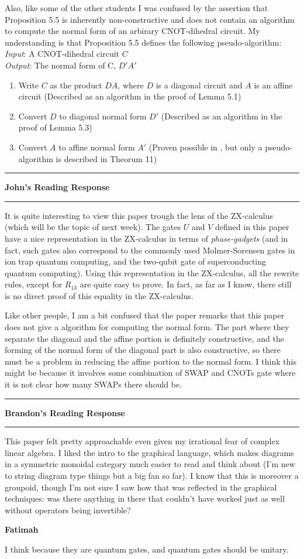 \documentclass{amsart}
\newcommand{\iam}[1]{
  \vspace{0.25em}
  \hrule
  \vspace{0.25em}
  \textbf{{#1}'s Reading Response}
  \vspace{0.25em}
  \hrule
  \vspace{1em}
}
\newcommand{\respond}[1]{
  \vspace{1em} \textbf{#1}
}
\begin{document}
Also, like some of the other students I was confused by the assertion that Proposition 5.5 is inherently non-constructive and does not contain an algorithm to compute the normal form of an arbirary CNOT-dihedral circuit. My understanding is that Proposition 5.5 defines the following pseudo-algorithm:
\\
\textit{Input}: A CNOT-dihedral circuit $C$\\
\textit{Output}: The normal form of C, $D'A'$\\
\begin{enumerate}
    \item Write $C$ as the product $DA$, where $D$ is a diagonal circuit and $A$ is an affine circuit (Described as an algorithm in the proof of Lemma 5.1)
    \item Convert $D$ to diagonal normal form $D'$ (Described as an algorithm in the proof of Lemma 5.3)
    \item Convert $A$ to affine normal form $A'$ (Proven possible in \cite{LafontBooleanCircuits}, but only a pseudo-algorithm is described in Theorum 11)
\end{enumerate}

\iam{John}

It is quite interesting to view this paper trough the lens of the ZX-calculus (which will be the topic of next week). The gates $U$ and $V$ defined in this paper have a nice representation in the ZX-calculus in terms of \emph{phase-gadgets} (and in fact, such gates also correspond to the commonly used Molmer-Sorensen gates in ion trap quantum computing, and the two-qubit gate of superconducting quantum computing). Using this representation in the ZX-calculus, all the rewrite rules, except for $R_{13}$ are quite easy to prove. In fact, as far as I know, there still is no direct proof of this equality in the ZX-calculus.

Like other people, I am a bit confused that the paper remarks that this paper does not give a algorithm for computing the normal form. The part where they separate the diagonal and the affine portion is definitely constructive, and the forming of the normal form of the diagonal part is also constructive, so there must be a problem in reducing the affine portion to the normal form. I think this might be because it involves some combination of SWAP and CNOTs gate where it is not clear how many SWAPs there should be.


\iam{Brandon}

This paper felt pretty approachable even given my irrational fear of complex linear algebra.  I liked the intro to the graphical language, which makes diagrams in a symmetric monoidal category much easier to read and think about (I'm new to string diagram type things but a big fan so far).  I know that this is moreover a groupoid, though I'm not sure I saw how that was reflected in the graphical techniques: was there anything in there that couldn't have worked just as well without operators being invertible?
\respond{Fatimah}
I think because they are quantum gates, and quantum gates should be unitary.
\end{document}
